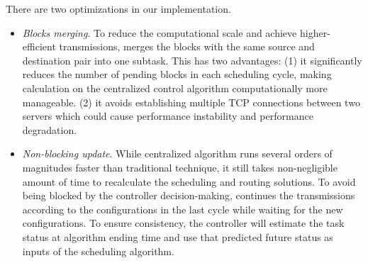 There are two optimizations in our implementation.
\begin{itemize}
\item \emph{Blocks merging}. 
To reduce the computational scale and achieve higher-efficient transmissions, \name merges the blocks with the same source and destination pair into one subtask. 
This has two advantages: (1) it significantly reduces the number of pending blocks in each scheduling cycle, making calculation on the centralized control algorithm computationally more manageable. 
(2) it avoids establishing multiple TCP connections between two servers which could cause performance instability and  performance degradation.
\item \emph{Non-blocking update}. While \name centralized algorithm runs several orders of magnitudes faster than traditional technique, it still takes non-negligible amount of time to recalculate the scheduling and routing solutions. To avoid being blocked by the controller decision-making, \name continues the transmissions according to the configurations in the last cycle while waiting for the new configurations. To ensure consistency, the controller will estimate the task status at algorithm ending time and use that predicted future status as inputs of the scheduling algorithm.
\end{itemize}

%
%
%
%


